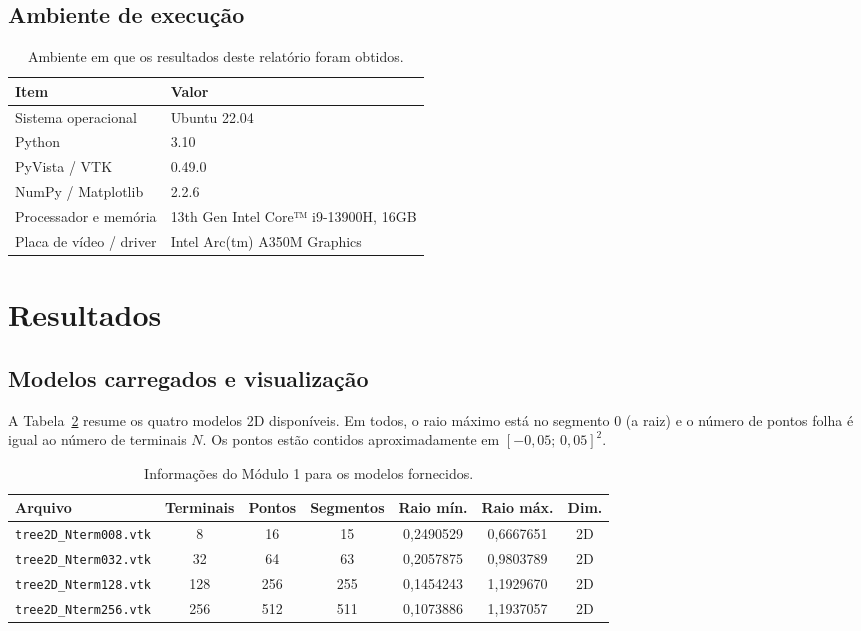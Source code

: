 \documentclass[11pt, a4paper]{article}
\begin{document}
\subsection{Ambiente de execução}
\begin{table}[htbp]
  \centering
  \small
  \caption{Ambiente em que os resultados deste relatório foram obtidos.}
  \label{tab:ambiente}
  \begin{tabular}{ll}
    \toprule
    \textbf{Item} & \textbf{Valor} \\
    \midrule
    Sistema operacional & Ubuntu 22.04 \\
    Python & 3.10 \\
    PyVista / VTK & 0.49.0 \\
    NumPy / Matplotlib & 2.2.6 \\
    Processador e memória & 13th Gen Intel Core™ i9-13900H, 16GB\\
    Placa de vídeo / driver & Intel Arc(tm) A350M Graphics\\
    \bottomrule
  \end{tabular}
\end{table}

\section{Resultados}
\label{sec:resultados}

\subsection{Modelos carregados e visualização}
A Tabela~\ref{tab:modelos} resume os quatro modelos 2D disponíveis. Em todos, o raio máximo está no segmento 0 (a raiz) e o número de pontos folha é igual ao número de terminais $N$. Os pontos estão contidos aproximadamente em $[-0{,}05;\,0{,}05]^2$.

\begin{table}[htbp]
  \centering
  \small
  \caption{Informações do Módulo 1 para os modelos fornecidos.}
  \label{tab:modelos}
  \begin{tabular}{lcccccc}
    \toprule
    \textbf{Arquivo} & \textbf{Terminais} & \textbf{Pontos} & \textbf{Segmentos} & \textbf{Raio mín.} & \textbf{Raio máx.} & \textbf{Dim.} \\
    \midrule
    \texttt{tree2D\_Nterm008.vtk} & 8 & 16 & 15 & 0,2490529 & 0,6667651 & 2D \\
    \texttt{tree2D\_Nterm032.vtk} & 32 & 64 & 63 & 0,2057875 & 0,9803789 & 2D \\
    \texttt{tree2D\_Nterm128.vtk} & 128 & 256 & 255 & 0,1454243 & 1,1929670 & 2D \\
    \texttt{tree2D\_Nterm256.vtk} & 256 & 512 & 511 & 0,1073886 & 1,1937057 & 2D \\
    \bottomrule
  \end{tabular}
\end{table}
\end{document}

